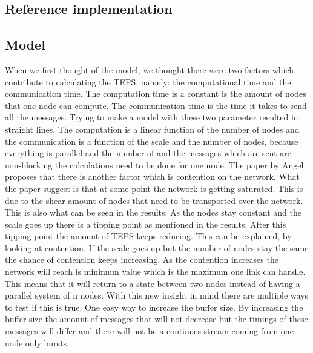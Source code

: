 \subsection{Reference implementation}


\subsection{Model}
When we first thought of the model, we thought there were two factors which contribute to calculating the TEPS, namely: the computational time and the communication time. The computation time is a constant is the amount of nodes that one node can compute. The communication time is the time it takes to send all the messages. Trying to make a model with these two parameter resulted in straight lines. The computation is a linear function of the number of nodes and the communication is a function of the scale and the number of nodes, because everything is parallel and the number of and the messages which are sent are non-blocking the calculations need to be done for one node. 
The paper by Angel proposes that there is another factor which is contention on the network. What the paper suggest is that at some point the network is getting saturated. This is due to the shear amount of nodes that need to be transported over the network. This is also what can be seen in the results. As the nodes stay constant and the scale goes up there is a tipping point as mentioned in the results. After this tipping point the amount of TEPS keeps reducing. This can be explained, by looking at contention. If the scale goes up but the number of nodes stay the same the chance of contention keeps increasing. As the contention increases the network will reach is minimum value which is the maximum one link can handle. This means that it will return to a state between two nodes instead of having a parallel system of n nodes.
With this new insight in mind there are multiple ways to test if this is true. One easy way to increase the buffer size. By increasing the buffer size the amount of messages that will not decrease but the timings of these messages will differ and there will not be a continues stream coming from one node only bursts.
 
 